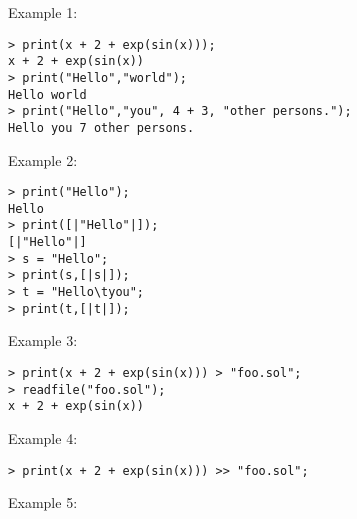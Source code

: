\noindent Example 1: 
\begin{center}\begin{minipage}{15cm}\begin{Verbatim}[frame=single]
> print(x + 2 + exp(sin(x))); 
x + 2 + exp(sin(x))
> print("Hello","world");
Hello world
> print("Hello","you", 4 + 3, "other persons.");
Hello you 7 other persons.
\end{Verbatim}
\end{minipage}\end{center}
\noindent Example 2: 
\begin{center}\begin{minipage}{15cm}\begin{Verbatim}[frame=single]
> print("Hello");
Hello
> print([|"Hello"|]);
[|"Hello"|]
> s = "Hello";
> print(s,[|s|]);
> t = "Hello\tyou";
> print(t,[|t|]);
\end{Verbatim}
\end{minipage}\end{center}
\noindent Example 3: 
\begin{center}\begin{minipage}{15cm}\begin{Verbatim}[frame=single]
> print(x + 2 + exp(sin(x))) > "foo.sol";
> readfile("foo.sol");
x + 2 + exp(sin(x))

\end{Verbatim}
\end{minipage}\end{center}
\noindent Example 4: 
\begin{center}\begin{minipage}{15cm}\begin{Verbatim}[frame=single]
> print(x + 2 + exp(sin(x))) >> "foo.sol";
\end{Verbatim}
\end{minipage}\end{center}
\noindent Example 5: 

